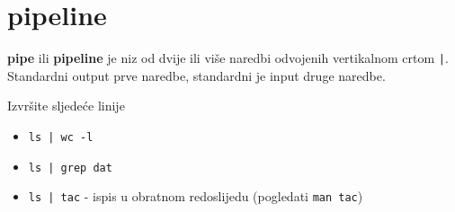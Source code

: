 \section*{pipeline}

\textbf{pipe} ili \textbf{pipeline} je niz od dvije ili više naredbi odvojenih vertikalnom crtom \lstinline!|!. Standardni output prve naredbe, standardni je input druge naredbe.

\begin{zadatak} Izvršite sljedeće linije
\begin{itemize}
\item \lstinline!ls | wc -l!
\item \lstinline!ls | grep dat!
\item \lstinline!ls | tac! - ispis u obratnom redoslijedu (pogledati \texttt{man tac})
\end{itemize}
\end{zadatak}
\begin{comment}
 
\vfill
\begin{itemize}
\renewcommand{\labelitemi}{\textbf{$\rightarrow$}}
\item Popis svih pokrenutih naredbi eksportirajte u datoteku imena \texttt{prezime\_ime\_vj5.txt}. Uploadajte datoteku na \href{https://moodle.oss.unist.hr/course/view.php?id=133}{http://moodle.oss.unist.hr}.
\end{itemize}		

\end{comment}
